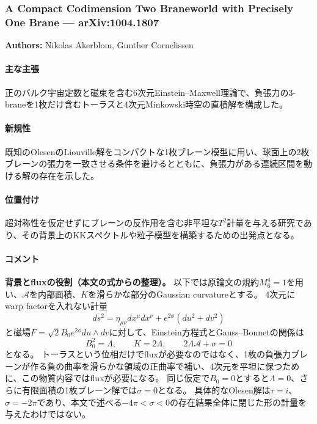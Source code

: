 \subsubsection{A Compact Codimension Two Braneworld with Precisely One Brane --- arXiv:1004.1807}

\textbf{Authors:} Nikolas Akerblom, Gunther Cornelissen

\paragraph{主な主張}
正のバルク宇宙定数と磁束を含む6次元Einstein--Maxwell理論で、負張力の3-braneを1枚だけ含むトーラスと4次元Minkowski時空の直積解を構成した\cite{Akerblom:2010OneBrane}。

\paragraph{新規性}
既知のOlesenのLiouville解をコンパクトな1枚ブレーン模型に用い、球面上の2枚ブレーンの張力を一致させる条件を避けるとともに、負張力がある連続区間を動ける解の存在を示した。

\paragraph{位置付け}
超対称性を仮定せずにブレーンの反作用を含む非平坦な\(T^2\)計量を与える研究であり、その背景上のKKスペクトルや粒子模型を構築するための出発点となる。

\paragraph{コメント}
\textbf{背景とfluxの役割（本文の式からの整理）。}
以下では原論文の規約\(M_6^4=1\)を用い、\(\mathcal A\)を内部面積、\(K\)を滑らかな部分のGaussian curvatureとする。
4次元にwarp factorを入れない計量
\[
 ds^2=\eta_{\mu\nu}dx^\mu dx^\nu+e^{2\phi}(du^2+dv^2)
\]
と磁場\(F=\sqrt{2}B_0e^{2\phi}du\wedge dv\)に対して、Einstein方程式とGauss--Bonnetの関係は
\[
 B_0^2=\Lambda,\qquad K=2\Lambda,\qquad
 2\Lambda\mathcal A+\sigma=0
\]
となる\cite{Akerblom:2010OneBrane}。
トーラスという位相だけでfluxが必要なのではなく、1枚の負張力ブレーンが作る負の曲率を滑らかな領域の正曲率で補い、4次元を平坦に保つために、この物質内容ではfluxが必要になる。
同じ仮定で\(B_0=0\)とすると\(\Lambda=0\)、さらに有限面積の1枚ブレーン解では\(\sigma=0\)となる。
具体的なOlesen解は\(\tau=i\)、\(\sigma=-2\pi\)であり、本文で述べる\(-4\pi<\sigma<0\)の存在結果全体に閉じた形の計量を与えたわけではない。

